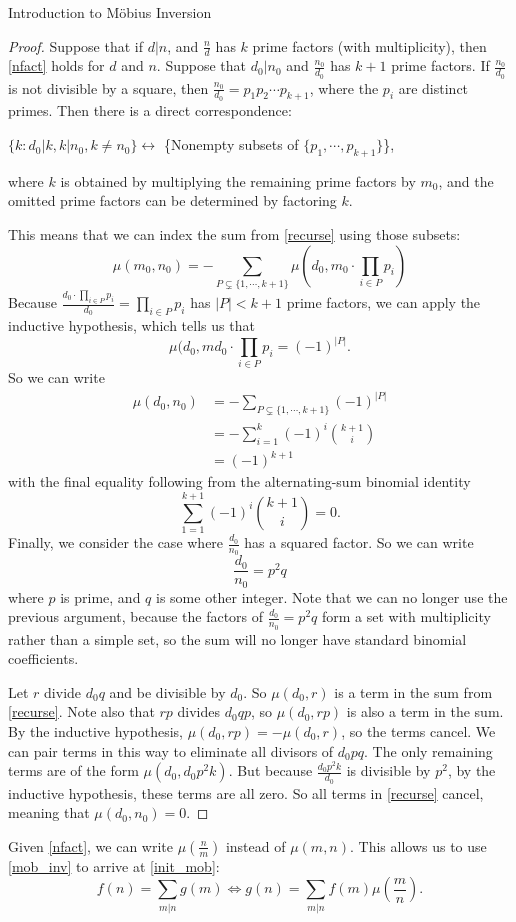\documentclass[12pt]{pom_thesis}
\begin{document}
\begin{chapter}{Introduction to M\"obius Inversion}
\begin{proof}
Suppose that if $d|n$, and $\frac nd$ has $k$ prime factors (with multiplicity), then \ref{nfact} holds for $d$ and $n$. Suppose that $d_0|n_0$ and $\frac {n_0}{d_0}$ has $k+1$ prime factors. If $\frac{n_0}{d_0}$ is not divisible by a square, then $\frac{n_0}{d_0} = p_1p_2\cdots p_{k+1}$, where the $p_i$ are distinct primes. Then there is a direct correspondence:
\begin{center}$\{k : d_0|k, k|n_0, k\neq n_0\} \leftrightarrow$ \{Nonempty subsets of $\{p_1,\cdots,p_{k+1}\}$\},\end{center}
where $k$ is obtained by multiplying the remaining prime factors by $m_0$, and the omitted prime factors can be determined by factoring $k$.

This means that we can index the sum from \ref{recurse} using those subsets:
\[
\mu(m_0, n_0) = -\sum_{P \subsetneq \{1,\cdots,k+1\}} \mu(d_0, m_0\cdot \prod_{i \in P}p_i )
\]
Because $\frac{d_0\cdot \prod_{i \in P}p_i}{d_0} = \prod_{i \in P}p_i$ has $|P| < k + 1$ prime factors, we can apply the inductive hypothesis, which tells us that 
\[
\mu(d_0, md_0\cdot \prod_{i \in P}p_i = (-1)^{|P|}.
\]
So we can write
\begin{align*}
\mu(d_0, n_0) &= -\sum_{P \subsetneq \{1,\cdots,k+1\}} (-1)^{|P|}\\
&= -\sum_{i = 1}^{k}(-1)^i{k+1 \choose i}\\
&= (-1)^{k+1}
\end{align*}
with the final equality following from the alternating-sum binomial identity
\[
\sum_{1=1}^{k+1}(-1)^i{k+1 \choose i} = 0.
\]
Finally, we consider the case where $\frac {d_0}{n_0}$ has a squared factor. So we can write 
\[
\frac {d_0}{n_0} = p^2q
\]
where $p$ is prime, and $q$ is some other integer. Note that we can no longer use the previous argument, because the factors of $\frac {d_0}{n_0} = p^2q$ form a set with multiplicity rather than a simple set, so the sum will no longer have standard binomial coefficients.

Let $r$ divide $d_0q$ and be divisible by $d_0$. So $\mu(d_0, r)$ is a term in the sum from \ref{recurse}. Note also that $rp$ divides $d_0qp$, so $\mu(d_0, rp)$ is also a term in the sum. By the inductive hypothesis, $\mu(d_0, rp) = -\mu(d_0, r)$, so the terms cancel. We can pair terms in this way to eliminate all divisors of $d_0pq$. The only remaining terms are of the form $\mu(d_0, d_0p^2k)$. But because $\frac{d_0p^2k}{d_0}$ is divisible by $p^2$, by the inductive hypothesis, these terms are all zero. So all terms in \ref{recurse} cancel, meaning that $\mu(d_0, n_0) = 0$.
\end{proof}
Given \ref{nfact}, we can write $\mu(\frac nm)$ instead of $\mu(m,n)$. This allows us to use \ref{mob_inv} to arrive at \ref{init_mob}:
\[
f(n) = \sum_{m | n} g(m) \iff g(n) = \sum_{m | n}  f(m)\mu\left(\frac mn\right).
\]

\end{chapter}
\end{document}
